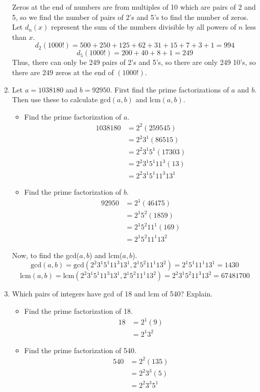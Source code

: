 \documentclass[class=article, crop=false]{standalone}
\begin{document}
\begin{enumerate}
  Zeros at the end of numbers are from multiples of 10 which are pairs of 2 and 5, so
  we find the number of pairs of 2's and 5's to find the number of zeros. Let $d_n(x)$
  represent the sum of the numbers divisible by all powers of $n$ less than $x$. 
  $$d_2(1000!) = 500 + 250 + 125 + 62 + 31 + 15 + 7 + 3 + 1 = 994$$
  $$d_5(1000!) = 200 + 40 + 8 + 1 = 249$$
  Thus, there can only be 249 pairs of 2's and 5's, so there are only 249 
  10's, so there are 249 zeros at the end of $(1000!)$.

\item
  Let $a=1038180$ and $b=92950$.
  First find the prime factorizations of $a$ and $b$.
  Then use these to calculate $\mbox{gcd}(a,b)$ and $\mbox{lcm}(a,b)$.\hfill{}

  \begin{itemize}
	\item[] Find the prime factorization of $a$.
		\begin{align*}
		  1038180 &= 2^2 (259545) \\
		  &= 2^2 3^1 (86515) \\
		  &= 2^2 3^1 5^1 (17303) \\
		  &= 2^2 3^1 5^1 11^3 (13) \\
		  &= 2^2 3^1 5^1 11^3 13^1
		\end{align*} 
	\item[] Find the prime factorization of $b$. 
		\begin{align*}
		  92950 &= 2^1 (46475) \\
		  &= 2^1 5^2 (1859) \\
		  &= 2^1 5^2 11^1 (169) \\
		  &= 2^1 5^2 11^1 13^2
		\end{align*}
  \end{itemize}
  Now, to find the gcd($a,b$) and lcm($a,b$).
  $$\text{gcd}(a,b) = \text{gcd}(2^2 3^1 5^1 11^3 13^1, 2^1 5^2 11^1 13^2) = 2^1 5^1 11^1 13^1 = 1430$$
  $$\text{lcm}(a,b) = \text{lcm}(2^2 3^1 5^1 11^3 13^1, 2^1 5^2 11^1 13^2) = 2^2 3^1 5^2 11^3 13^2 = 67481700$$

\item
  Which pairs of integers have gcd of 18 and lcm of 540?  Explain.\hfill{}

  \begin{itemize}
	\item[] Find the prime factorization of 18.
		\begin{align*}
		  18 &= 2^1 (9) \\
		  &= 2^1 3^2
		\end{align*} 
	\item[] Find the prime factorization of 540. 
		\begin{align*}
		  540 &= 2^2 (135) \\
		  &= 2^2 3^3 (5) \\
		  &= 2^2 3^3 5^1
		\end{align*}
  \end{itemize}
  

\end{enumerate}
\end{document}
